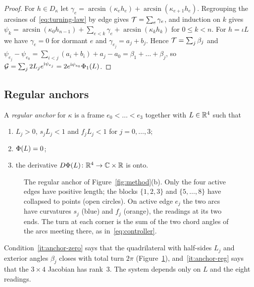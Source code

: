 \begin{proof}
For $h\in D_\kappa$ let
$\gamma_e=\arcsin(\kappa_eh_e)+\arcsin(\kappa_{e+1}h_e)$. Regrouping the
arcsines of~\eqref{eq:turning-law} by edge gives $\mathcal{T}=\sum_e\gamma_e$, and
induction on $k$ gives
$\psi_k=\arcsin(\kappa_0h_{n-1})+\sum_{e<k}\gamma_e+\arcsin(\kappa_kh_k)$ for
$0\le k<n$. For $h=\iota L$ we have $\gamma_e=0$ for dormant $e$ and
$\gamma_{e_j}=a_j+b_j$. Hence $\mathcal{T}=\sum_j\beta_j$ and
$\psi_{e_j}-\psi_{e_0}=\sum_{i<j}(a_i+b_i)+a_j-a_0=\beta_1+\dots+\beta_j$, so
$\mathcal{G}=\sum_j2L_je^{\mathrm{i}\psi_{e_j}}=2e^{\mathrm{i}\psi_{e_0}}\Phi_1(L)$.
\end{proof}


\subsection{Regular anchors}

\begin{definition}\label{def:anchor}
A \emph{regular anchor} for $\kappa$ is a frame $e_0<\dots<e_3$ together with
$L\in\mathbb{R}^4$ such that
\begin{enumerate}[label=\textup{(A\arabic*)}]
\item\label{it:anchor-pos} $L_j>0$, $s_jL_j<1$ and $f_jL_j<1$ for
  $j=0,\dots,3$;
\item\label{it:anchor-zero} $\Phi(L)=0$;
\item\label{it:anchor-reg} the derivative $D\Phi(L)\colon\mathbb{R}^4\to\mathbb{C}\times\mathbb{R}$
  is onto.
\end{enumerate}
\end{definition}

\begin{figure}[t]
\centering
{}
\caption{The regular anchor of Figure~\ref{fig:method}(b). Only the four
active edges have positive length; the blocks $\{1,2,3\}$ and $\{5,\dots,8\}$
have collapsed to points (open circles). On active edge $e_j$ the two arcs
have curvatures $s_j$ (blue) and $f_j$ (orange), the readings at its two
ends. The turn at each corner is the sum of the two chord angles of the arcs
meeting there, as in~\eqref{eq:controller}.}
\label{fig:anchor}
\end{figure}

Condition~\ref{it:anchor-zero} says that the quadrilateral with half-sides
$L_j$ and exterior angles $\beta_j$ closes with total turn $2\pi$
(Figure~\ref{fig:anchor}), and~\ref{it:anchor-reg} says that the $3\times4$
Jacobian has rank~$3$. The system depends only on $L$ and the eight readings.

